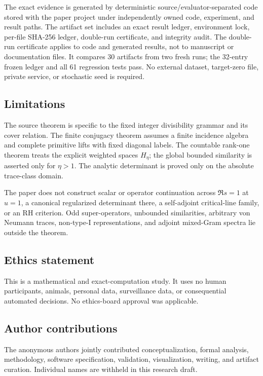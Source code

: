 The exact evidence is generated by deterministic source/evaluator-separated
code stored with the paper project under independently owned code,
experiment, and result paths. The artifact set includes an exact result
ledger, environment lock, per-file SHA-256 ledger, double-run certificate,
and integrity audit. The double-run certificate applies to code and generated
results, not to manuscript or documentation files. It compares 30 artifacts
from two fresh runs; the 32-entry frozen ledger and all 61 regression tests
pass. No external dataset, target-zero file, private service, or stochastic
seed is required.

\subsection{Limitations}

The source theorem is specific to the fixed integer divisibility grammar and
its cover relation. The finite conjugacy theorem assumes a finite incidence
algebra and complete primitive lifts with fixed diagonal labels. The
countable rank-one theorem treats the explicit weighted spaces \(H_\eta\);
the global bounded similarity is asserted only for \(\eta>1\). The analytic
determinant is proved only on the absolute trace-class domain.

The paper does not construct scalar or operator continuation across
\(\Re s=1\) at \(u=1\), a canonical regularized determinant there, a
self-adjoint critical-line family, or an RH criterion. Odd super-operators,
unbounded similarities, arbitrary von Neumann traces, non-type-I
representations, and adjoint mixed-Gram spectra lie outside the theorem.

\subsection{Ethics statement}

This is a mathematical and exact-computation study. It uses no human
participants, animals, personal data, surveillance data, or consequential
automated decisions. No ethics-board approval was applicable.

\subsection{Author contributions}

The anonymous authors jointly contributed conceptualization, formal analysis,
methodology, software specification, validation, visualization, writing, and
artifact curation. Individual names are withheld in this research draft.

